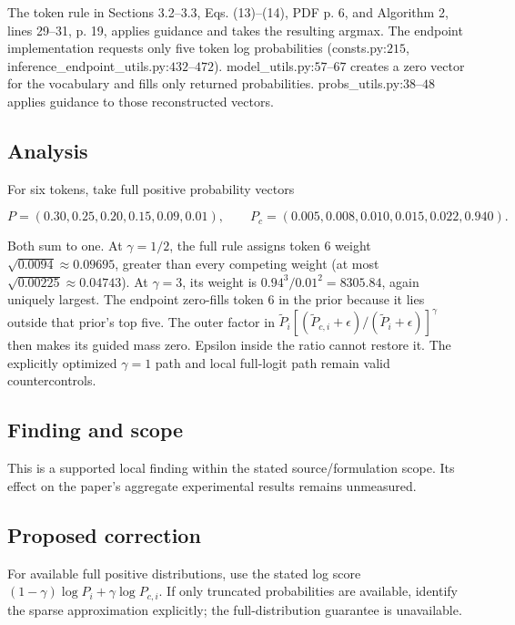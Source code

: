 \documentclass[11pt]{article}
\begin{document}
The token rule in Sections 3.2–3.3, Eqs. (13)–(14), PDF p. 6, and Algorithm 2, lines 29–31, p. 19, applies guidance and takes the resulting argmax. The endpoint implementation requests only five token log probabilities (consts.py:\(215\), inference\_endpoint\_utils.py:\(432\)–\(472\)). model\_utils.py:\(57\)–\(67\) creates a zero vector for the vocabulary and fills only returned probabilities. probs\_utils.py:\(38\)–\(48\) applies guidance to those reconstructed vectors.

\subsection*{Analysis}

For six tokens, take full positive probability vectors

\[P=(0.30,0.25,0.20,0.15,0.09,0.01),\qquad P_c=(0.005,0.008,0.010,0.015,0.022,0.940).\]

Both sum to one. At \(\gamma=1/2\), the full rule assigns token \(6\) weight \(\sqrt{0.0094}\approx0.09695\), greater than every competing weight (at most \(\sqrt{0.00225}\approx0.04743\)). At \(\gamma=3\), its weight is \(0.94^3/0.01^2=8305.84\), again uniquely largest. The endpoint zero-fills token \(6\) in the prior because it lies outside that prior’s top five. The outer factor in \(\widetilde P_i[(\widetilde P_{c,i}+\epsilon)/(\widetilde P_i+\epsilon)]^\gamma\) then makes its guided mass zero. Epsilon inside the ratio cannot restore it. The explicitly optimized \(\gamma=1\) path and local full-logit path remain valid countercontrols.

\subsection*{Finding and scope}

This is a supported local finding within the stated source/formulation scope. Its effect on the paper's aggregate experimental results remains unmeasured.

\subsection*{Proposed correction}

For available full positive distributions, use the stated log score \((1-\gamma)\log P_i+\gamma\log P_{c,i}\). If only truncated probabilities are available, identify the sparse approximation explicitly; the full-distribution guarantee is unavailable.
\end{document}
